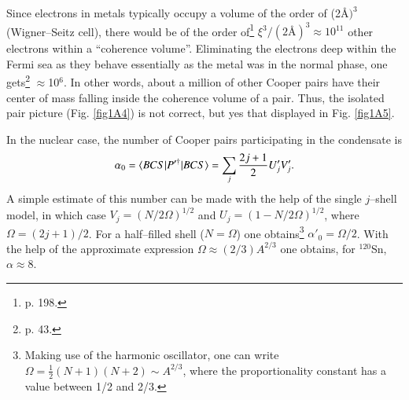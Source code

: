 \begin{subappendices}
Since electrons in metals typically occupy a volume of the order of (2\AA$)^3$ (Wigner--Seitz cell), there would be of the order of\footnote{\cite{Ketterson:99} p. 198.} $\xi^3/(2\text{\AA})^3\approx 10^{11}$ other electrons within a ``coherence volume''. Eliminating the electrons deep within the Fermi sea as they behave essentially as the metal was in the normal phase, one gets\footnote{\cite{Schrieffer:64} p. 43.} $\approx$10$^6$. In other words, about a million of other Cooper pairs have their center of mass falling inside the coherence volume of a pair. Thus, the isolated pair picture (Fig. \ref{fig1A4}) is not correct, but yes that displayed in Fig. \ref{fig1A5}.





 


 In the nuclear case, the number of Cooper pairs participating in the condensate is
 \begin{align}\label{eq3B11}
\alpha_0=\langle {BCS|P'^\dagger|BCS} \rangle=\sum_j\frac{2j+1}{2}U'_jV'_j.
 \end{align}
 A simple estimate of this number can be made with the help of the single $j$--shell model, in which case $V_j=(N/2\Omega)^{1/2}$ and $U_j=(1-N/2\Omega)^{1/2}$, where $\Omega=(2j+1)/2$. For a half--filled shell ($N=\Omega$) one obtains\footnote{Making use of the harmonic oscillator, one can write $\Omega=\frac{1}{2}(N+1)(N+2)\sim A^{2/3}$, where the proportionality constant has a value between 1/2 and 2/3.} $\alpha'_0=\Omega/2$. With the help of the approximate expression $\Omega\approx(2/3)A^{2/3}$ one obtains, for $^{120}$Sn, $\alpha\approx8$.
 

\end{subappendices}
